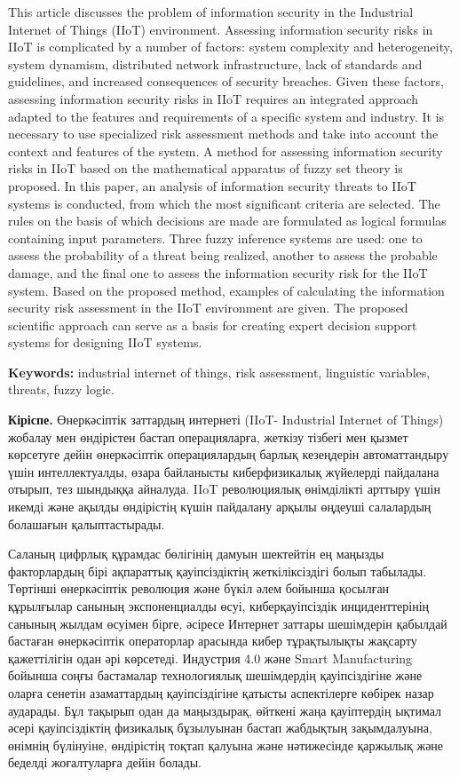 \documentclass[
]{article}
\begin{document}
This article discusses the problem of information security in the
Industrial Internet of Things (IIoT) environment. Assessing information
security risks in IIoT is complicated by a number of factors: system
complexity and heterogeneity, system dynamism, distributed network
infrastructure, lack of standards and guidelines, and increased
consequences of security breaches. Given these factors, assessing
information security risks in IIoT requires an integrated approach
adapted to the features and requirements of a specific system and
industry. It is necessary to use specialized risk assessment methods and
take into account the context and features of the system. A method for
assessing information security risks in IIoT based on the mathematical
apparatus of fuzzy set theory is proposed. In this paper, an analysis of
information security threats to IIoT systems is conducted, from which
the most significant criteria are selected. The rules on the basis of
which decisions are made are formulated as logical formulas containing
input parameters. Three fuzzy inference systems are used: one to assess
the probability of a threat being realized, another to assess the
probable damage, and the final one to assess the information security
risk for the IIoT system. Based on the proposed method, examples of
calculating the information security risk assessment in the IIoT
environment are given. The proposed scientific approach can serve as a
basis for creating expert decision support systems for designing IIoT
systems.

\textbf{Keywords:} industrial internet of things, risk assessment,
linguistic variables, threats, fuzzy logic.

\textbf{Кіріспе.} Өнеркәсіптік заттардың интернеті (IIoT- Industrial
Internet of Things) жобалау мен өндірістен бастап операцияларға, жеткізу
тізбегі мен қызмет көрсетуге дейін өнеркәсіптік операциялардың барлық
кезеңдерін автоматтандыру үшін интеллектуалды, өзара байланысты
киберфизикалық жүйелерді пайдалана отырып, тез шындыққа айналуда. IIoT
революциялық өнімділікті арттыру үшін икемді және ақылды өндірістің
күшін пайдалану арқылы өңдеуші салалардың болашағын қалыптастырады.

Саланың цифрлық құрамдас бөлігінің дамуын шектейтін ең маңызды
факторлардың бірі ақпараттық қауіпсіздіктің жеткіліксіздігі болып
табылады. Төртінші өнеркәсіптік революция және бүкіл әлем бойынша
қосылған құрылғылар санының экспоненциалды өсуі, киберқауіпсіздік
инциденттерінің санының жылдам өсуімен бірге, әсіресе Интернет заттары
шешімдерін қабылдай бастаған өнеркәсіптік операторлар арасында кибер
тұрақтылықты жақсарту қажеттілігін одан әрі көрсетеді. Индустрия 4.0
және Smart Manufacturing бойынша соңғы бастамалар технологиялық
шешімдердің қауіпсіздігіне және оларға сенетін азаматтардың
қауіпсіздігіне қатысты аспектілерге көбірек назар аударады. Бұл тақырып
одан да маңыздырақ, өйткені жаңа қауіптердің ықтимал әсері
қауіпсіздіктің физикалық бұзылуынан бастап жабдықтың зақымдалуына,
өнімнің бүлінуіне, өндірістің тоқтап қалуына және нәтижесінде қаржылық
және беделді жоғалтуларға дейін болады.
\end{document}
